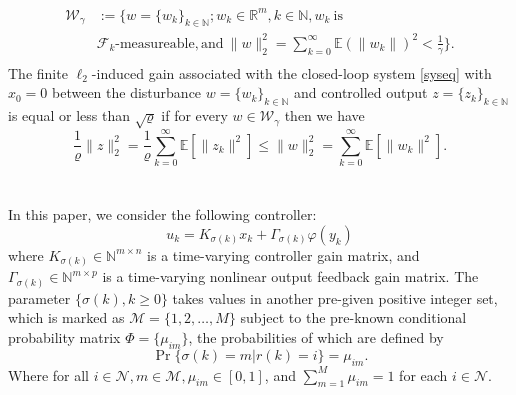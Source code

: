 \documentclass[conference]{IEEEtran}
\begin{document}
\begin{equation}
	\begin{split}
		\mathcal{W}_{\gamma}&:=\{w=\{w_k\}_{k\in\mathbb{N}};w_k\in\mathbb{R}^{m}, k\in\mathbb{N}, w_k \ \text{is} \\
		&\mathcal{F}_k\text{-measureable}, \text{and}\  \|w\|^2_2=\sum_{k=0}^{\infty}\mathbb{E}(\|w_k\|)^2<\frac{1}{\gamma}\}.\\
	\end{split}
\end{equation}
The finite $\ell_2$-induced gain associated with the closed-loop system \eqref{syseq} with $x_0=0$ between the disturbance $w=\{w_k\}_{k\in\mathbb{N}}$ and controlled output $z=\{z_k\}_{k\in\mathbb{N}}$ is equal or less than $\sqrt{\varrho}$ if for every $w\in\mathcal{W}_{\gamma}$ then we have
\begin{equation}
\frac{1}{\varrho}\|z\|^2_2=\frac{1}{\varrho}\sum_{k=0}^{\infty}\mathbb{E}\left[\|z_k\|^2\right] \leq \|w\|^2_2=\sum_{k=0}^{\infty}\mathbb{E}\left[\|w_k\|^2\right].
\end{equation}\\
\\
In this paper, we consider the following controller:
\begin{equation}\label{asycontroller}
u_k=K_{\sigma(k)}x_k+\varGamma_{\sigma(k)}\varphi(y_k) 
\end{equation}
where $K_{\sigma(k)}\in \mathbb{N}^{m\times n}$ is a time-varying controller gain matrix, and $\varGamma_{\sigma(k)}\in \mathbb{N}^{m\times p}$ is a time-varying nonlinear output feedback gain matrix. The parameter $\{\sigma(k),k\geq0\}$ takes values in another pre-given positive integer set, which is marked as $\mathcal{M}=\{1,2,\dots,M\}$ subject to the pre-known conditional probability matrix $\varPhi=\{\mu_{im} \}$, the probabilities of which are defined by
\begin{equation}
\Pr\{\sigma(k)=m|r(k)=i\}=\mu_{im}.
\end{equation}
Where for all $i\in\mathcal{N}, m\in\mathcal{M}, \mu_{im}\in [0,1]$, and $\sum_{m=1}^{M}\mu_{im}=1$ for each $i\in\mathcal{N}$.\\
\\
\end{document}
